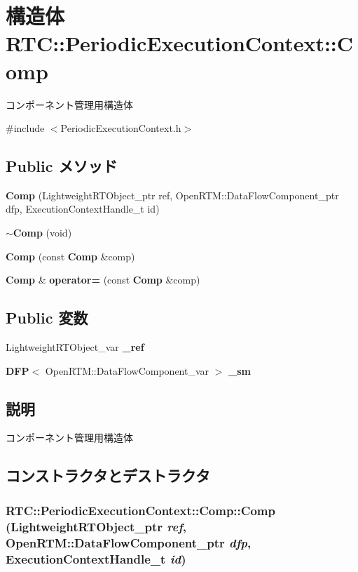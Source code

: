 \section{構造体 RTC::PeriodicExecutionContext::Comp}
\label{structRTC_1_1PeriodicExecutionContext_1_1Comp}


コンポーネント管理用構造体  




{\ttfamily \#include $<$PeriodicExecutionContext.h$>$}

\subsection*{Public メソッド}
\begin{DoxyCompactItemize}
\item 
{\bf Comp} (LightweightRTObject\_\-ptr ref, OpenRTM::DataFlowComponent\_\-ptr dfp, ExecutionContextHandle\_\-t id)
\item 
{\bf $\sim$Comp} (void)
\item 
{\bf Comp} (const {\bf Comp} \&comp)
\item 
{\bf Comp} \& {\bf operator=} (const {\bf Comp} \&comp)
\end{DoxyCompactItemize}
\subsection*{Public 変数}
\begin{DoxyCompactItemize}
\item 
LightweightRTObject\_\-var {\bf \_\-ref}
\item 
{\bf DFP}$<$ OpenRTM::DataFlowComponent\_\-var $>$ {\bf \_\-sm}
\end{DoxyCompactItemize}


\subsection{説明}
コンポーネント管理用構造体 

\subsection{コンストラクタとデストラクタ}
\subsubsection[{Comp}]{\setlength{\rightskip}{0pt plus 5cm}RTC::PeriodicExecutionContext::Comp::Comp (LightweightRTObject\_\-ptr {\em ref}, \/  OpenRTM::DataFlowComponent\_\-ptr {\em dfp}, \/  ExecutionContextHandle\_\-t {\em id})\hspace{0.3cm}{\ttfamily  [inline]}}\label{structRTC_1_1PeriodicExecutionContext_1_1Comp_a9dc4712ecec7794a3523c8982f65ce93}
